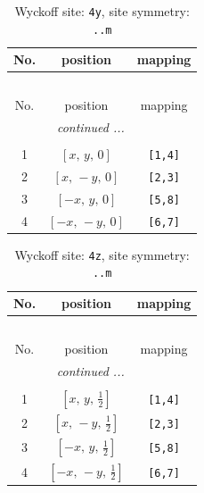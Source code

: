\documentclass[fleqn,8pt]{jsarticle}
\begin{document}
\renewcommand{\arraystretch}{1.2}
\begin{longtable}{ccc}
\caption{Wyckoff site: {\tt 4y}, site symmetry: {\tt ..m}}
 \\
 \hline \hline
No. & position & mapping \\ \hline \endfirsthead

\multicolumn{2}{l}{\tablename\ \thetable{}} \\
 \hline \hline
No. & position & mapping \\ \hline \endhead

 \hline \hline
\multicolumn{2}{r}{\footnotesize\it continued ...} \\ \endfoot

 \hline \hline
\multicolumn{2}{r}{} \\ \endlastfoot

1 & $\left[ x,\, y,\, 0 \right]$ & {\tt [1,4]} \\ \hline
2 & $\left[ x,\, - y,\, 0 \right]$ & {\tt [2,3]} \\ \hline
3 & $\left[ - x,\, y,\, 0 \right]$ & {\tt [5,8]} \\ \hline
4 & $\left[ - x,\, - y,\, 0 \right]$ & {\tt [6,7]} \\
\end{longtable}
\renewcommand{\arraystretch}{1.2}
\begin{longtable}{ccc}
\caption{Wyckoff site: {\tt 4z}, site symmetry: {\tt ..m}}
 \\
 \hline \hline
No. & position & mapping \\ \hline \endfirsthead

\multicolumn{2}{l}{\tablename\ \thetable{}} \\
 \hline \hline
No. & position & mapping \\ \hline \endhead

 \hline \hline
\multicolumn{2}{r}{\footnotesize\it continued ...} \\ \endfoot

 \hline \hline
\multicolumn{2}{r}{} \\ \endlastfoot

1 & $\left[ x,\, y,\, \frac{1}{2} \right]$ & {\tt [1,4]} \\ \hline
2 & $\left[ x,\, - y,\, \frac{1}{2} \right]$ & {\tt [2,3]} \\ \hline
3 & $\left[ - x,\, y,\, \frac{1}{2} \right]$ & {\tt [5,8]} \\ \hline
4 & $\left[ - x,\, - y,\, \frac{1}{2} \right]$ & {\tt [6,7]} \\
\end{longtable}
\end{document}
